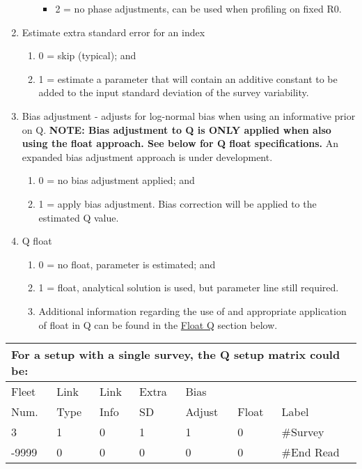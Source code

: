 \begin{enumerate}
\begin{enumerate}
\begin{itemize}
			\item 2 = no phase adjustments, can be used when profiling on fixed R0.
		\end{itemize}
	\end{enumerate}
	\item Estimate extra standard error for an index
	\begin{enumerate}
		\item 0 = skip (typical); and
		\item 1 = estimate a parameter that will contain an additive constant to be added to the input standard deviation of the survey variability.
	\end{enumerate}
	\item Bias adjustment - adjusts for log-normal bias when using an informative prior on Q. \textbf{NOTE: Bias adjustment to Q is ONLY applied when also using the float approach. See below for Q float specifications.} An expanded bias adjustment approach is under development.
	\begin{enumerate}
		\item 0 = no bias adjustment applied; and
		\item 1 = apply bias adjustment. Bias correction will be applied to the estimated Q value.
	\end{enumerate}
	\item Q float
	\begin{enumerate}
		\item 0 = no float, parameter is estimated; and
		\item 1 = float, analytical solution is used, but parameter line still required.
		\item Additional information regarding the use of and appropriate application of float in Q can be found in the \hyperlink{FloatQ}{Float Q} section below.
	\end{enumerate}
\end{enumerate}


\begin{longtable}{p{2cm} p{2cm} p{2cm} p{2cm} p{2cm} p{1.3cm} p{2.3cm}}
	\multicolumn{7}{l}{For a setup with a single survey, the Q setup matrix could be:} \\
	\hline
	Fleet \Tstrut & Link & Link & Extra & Bias   & & \\
	Num.          & Type & Info & SD    & Adjust & Float & Label \Bstrut\\
	\hline
	3 & 1 & 0 & 1 & 1 & 0 & \#Survey \Tstrut\\
	-9999 & 0 & 0 & 0 & 0 & 0 & \#End Read \Bstrut\\
	\hline
\end{longtable}



